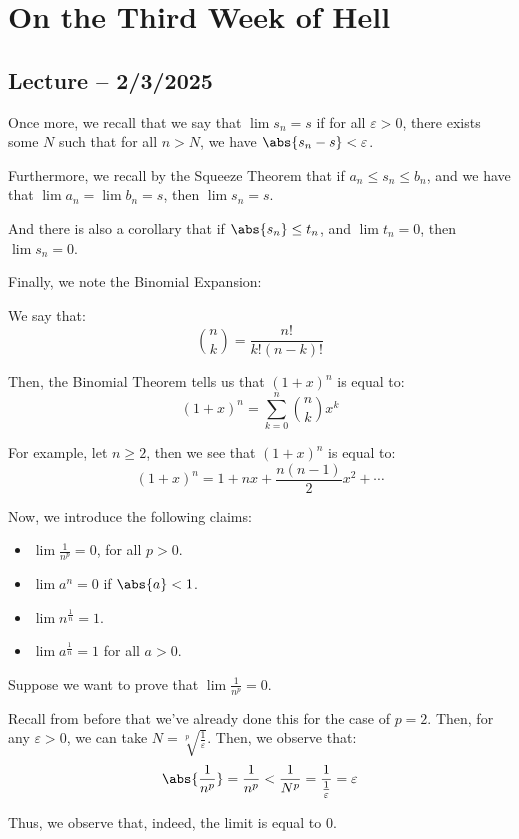 \documentclass[openany]{book}
\begin{document}
\chapter{On the Third Week of Hell}
\section{Lecture -- 2/3/2025}
Once more, we recall that we say that $\lim s_n = s$ if for all $\varepsilon > 0$, there exists some $N$ such that for all $n > N$, we have $\abs{s_n - s} < \varepsilon$.

Furthermore, we recall by the Squeeze Theorem that if $a_n \leq s_n \leq b_n$, and we have that $\lim a_n = \lim b_n = s$, then $\lim s_n = s$.

And there is also a corollary that if $\abs{s_n} \leq t_n$, and $\lim t_n = 0$, then $\lim s_n = 0$.

Finally, we note the Binomial Expansion:
\begin{thm}
	We say that:
	\begin{equation*}
		\binom n k = \frac{n!}{k!(n-k)!}
	\end{equation*}
	
	Then, the Binomial Theorem tells us that $(1+x)^{n}$ is equal to:
	\begin{equation*}
		(1+x)^{n} = \sum_{k=0}^{n} \binom n k x^{k}
	\end{equation*}
\end{thm}

For example, let $n \geq 2$, then we see that $(1+x)^{n}$ is equal to:
\begin{equation*}
	(1+x)^{n} = 1 + nx + \frac{n(n-1)}{2}x^{2} + \cdots
\end{equation*}

Now, we introduce the following claims:
\begin{itemize}
	\item $\lim \frac{1}{n^{p}} = 0$, for all $p > 0$.
	\item $\lim a^{n} = 0$ if $\abs{a} < 1$.
	\item $\lim n^{\frac{1}{n}} = 1$.
	\item $\lim a^{\frac{1}{n}} = 1$ for all $a > 0$.
\end{itemize}

\begin{example}
	Suppose we want to prove that $\lim \frac{1}{n^{p}} = 0$. 
	
	Recall from before that we've already done this for the case of $p = 2$. Then, for any $\varepsilon > 0$, we can take $N = \sqrt[p]{\frac{1}{\varepsilon}}$. Then, we observe that:
	\begin{equation*}
		\abs{\frac 1 {n^{p}}} = \frac{1}{n^{p}} < \frac{1}{N^{p}} = \frac{1}{\frac{1}{\varepsilon}} = \varepsilon
	\end{equation*}
	
	Thus, we observe that, indeed, the limit is equal to $0$.
\end{example}
\end{document}
